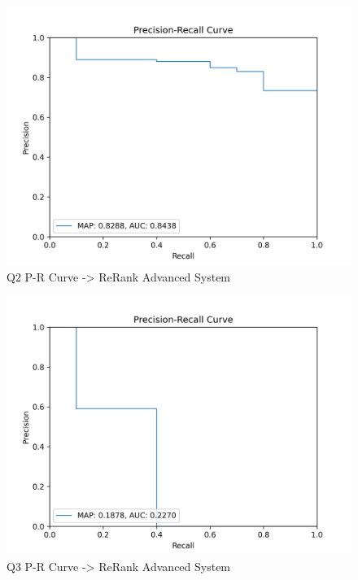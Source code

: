 \documentclass[sigconf]{acmart}
\begin{document}
\begin{figure}[H]
  \centering
  \includegraphics[width=0.8\linewidth]{precision_recall_q2r.png}
  \caption{Q2 P-R Curve -> ReRank Advanced System}
  \label{fig:precisionRecallReRank2}
\end{figure}

\begin{figure}[H]
  \centering
  \includegraphics[width=0.8\linewidth]{precision_recall_q3r.png}
  \caption{Q3 P-R Curve -> ReRank Advanced System}
  \label{fig:precisionRecallReRank3}
\end{figure}
\end{document}
